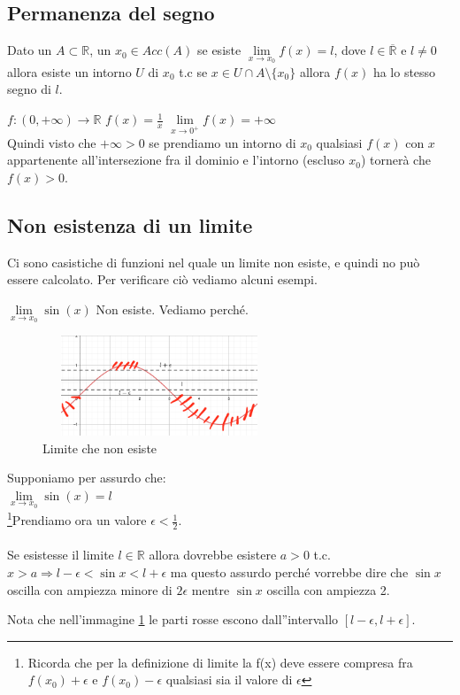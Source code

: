 \subsection{Permanenza del segno}
\begin{theorem}
Dato un $A \subset \mathbb{R}$, un $x_0 \in Acc(A)$ se esiste $\lim\limits_{x\to x_0}f(x) = l$, dove $l \in \overline{\mathbb{R}}$ e $l \neq 0$ allora esiste un intorno $U$ di $x_0$ t.c se $x \in U \cap A \setminus \{x_0\}$ allora $f(x)$ ha lo stesso segno di $l$.
\end{theorem}
\begin{example}
$f: (0, +\infty) \to \mathbb{R}$ \hspace{.5cm} $f(x) = \frac{1}{x}$ \hspace{.5cm} $\lim\limits_{x\to 0^+}f(x) = +\infty$ \\
Quindi visto che $+\infty > 0$ se prendiamo un intorno di $x_0$ qualsiasi $f(x)$ con $x$ appartenente all'intersezione fra il dominio e l'intorno (escluso $x_0$) tornerà che $f(x) > 0$. 
\end{example}

\subsection{Non esistenza di un limite}
Ci sono casistiche di funzioni nel quale un limite non esiste, e quindi no può essere calcolato. Per verificare ciò vediamo alcuni esempi.
\begin{example}
$\lim\limits_{x\to x_0} \sin(x)$ Non esiste. Vediamo perché.
\end{example}
\begin{figure}
    \vspace{-10pt}
    \centering
    \includegraphics[width=7cm, height=3cm]{images/es-limite-non-esiste.png}
    \caption{Limite che non esiste}
    \label{fig:limite-non-esiste}
\end{figure}

Supponiamo per assurdo che: \\$\lim\limits_{x\to x_0} \sin(x) = l$\\ \footnote{Ricorda che per la definizione di limite la f(x) deve essere compresa fra $f(x_0) + \epsilon$ e $f(x_0) - \epsilon$ qualsiasi sia il valore di $\epsilon$}Prendiamo ora un valore $\epsilon < \frac{1}{2}$. \\ \\
Se esistesse il limite $l \in \mathbb{R}$ allora dovrebbe esistere $a > 0$ t.c. $x > a \Longrightarrow l - \epsilon < \sin{x} < l + \epsilon$ ma questo assurdo perché vorrebbe dire che $\sin{x}$ oscilla con ampiezza minore di $2\epsilon$ mentre $\sin{x}$ oscilla con ampiezza 2. 
\begin{note}
Nota che nell'immagine \ref{fig:limite-non-esiste} le parti rosse escono dall''intervallo $[l-\epsilon, l+\epsilon]$.
\end{note}

